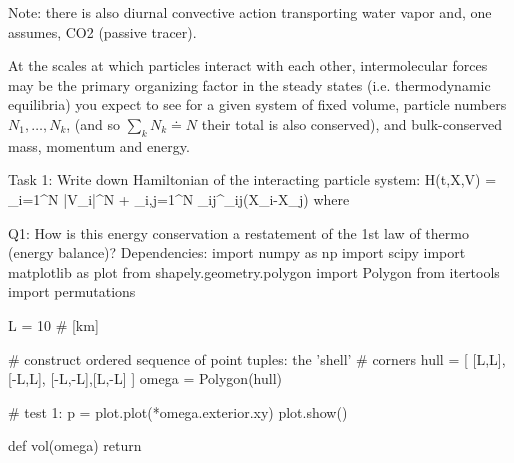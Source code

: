  Note: there is also diurnal convective action transporting
 water vapor and, one assumes, CO2 (passive tracer). 

 At the scales at which particles interact with each other,
 intermolecular forces may be the primary organizing factor
 in the steady states (i.e. thermodynamic equilibria)
 you expect to see for a given system of fixed volume, particle
 numbers $N_1, \ldots, N_k$, (and so $\sum_k N_k \doteq N$ their
 total is also conserved), and bulk-conserved mass, momentum and
 energy.

 Task 1: Write down Hamiltonian of the interacting particle system:
 H(t,X,V) =  \sum_{i=1}^N |V_i|^N +  \sum_{i,j=1}^N \phi_{ij}^{\gamma_{ij}}(X_i-X_j) 
 where
 
 Q1: How is this energy conservation a restatement of the 1st law of thermo (energy balance)?
 Dependencies:
import numpy as np
import scipy
import matplotlib as plot
from shapely.geometry.polygon import Polygon
from itertools import permutations

    L = 10 # [km]
    
    # construct ordered sequence of point tuples: the 'shell' 
    # corners
    hull = [ [L,L],[-L,L], [-L,-L],[L,-L] ]
    omega = Polygon(hull)
    
    # test 1:
    p = plot.plot(*omega.exterior.xy)
    plot.show()
    

def vol(omega)
    return 
